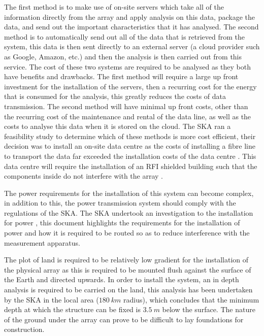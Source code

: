 \documentclass[11pt]{witseiepaper}
\begin{document}
\begin{bibunit}[witseie]
The first method is to make use of on-site servers which take all of the information directly from the array and apply analysis on this data, package the data, and send out the important characteristics that it has analysed. The second method is to automatically send out all of the data that is retrieved from the system, this data is then sent directly to an external server (a cloud provider such as Google, Amazon, etc.) and then the analysis is then carried out from this service.
The cost of these two systems are required to be analysed as they both have benefits and drawbacks.
The first method will require a large up front investment for the installation of the servers, then a recurring cost for the energy that is consumed for the analysis, this greatly reduces the costs of data transmission.
The second method will have minimal up front costs, other than the recurring cost of the maintenance and rental of the data line, as well as the costs to analyse this data when it is stored on the cloud.
The SKA ran a feasibility study to determine which of these methods is more cost efficient, their decision was to install an on-site data centre as the costs of installing a fibre line to transport the data far exceeded the installation costs of the data centre \cite[p.~17-18]{SKAFibre}.
This data centre will require the installation of an RFI shielded building such that the components inside do not interfere with the array \cite[p.~18]{SKAFibre}.

The power requirements for the installation of this system can become complex, in addition to this, the power transmission system should comply with the regulations of the SKA. The SKA undertook an investigation to the installation for power \cite{SKAFibre}, this document highlights the requirements for the installation of power and how it is required to be routed so as to reduce interference with the measurement apparatus.


The plot of land is required to be relatively low gradient for the installation of the physical array as this is required to be mounted flush against the surface of the Earth and directed upwards.
In order to install the system, an in depth analysis is required to be carried on the land, this analysis has been undertaken by the SKA in the local area ($180~km$ radius)\cite[p.~95,98]{SKAFibre}, which concludes that the minimum depth at which the structure can be fixed is $3.5~m$ below the surface. The nature of the ground under the array can prove to be difficult to lay foundations for construction.


\end{bibunit}
\end{document}
